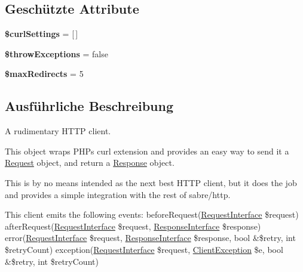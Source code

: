 \subsection*{Geschützte Attribute}
\begin{DoxyCompactItemize}
\item 
\mbox{\label{class_sabre_1_1_h_t_t_p_1_1_client_afe002e1ef057ea8527dc64a347d3f161}} 
{\bfseries \$curl\+Settings} = \mbox{[}$\,$\mbox{]}
\item 
\mbox{\label{class_sabre_1_1_h_t_t_p_1_1_client_a0df41d188b89967859a97aade5358a3b}} 
{\bfseries \$throw\+Exceptions} = false
\item 
\mbox{\label{class_sabre_1_1_h_t_t_p_1_1_client_ac54b34692677c31c7ca271a8ea03bc4e}} 
{\bfseries \$max\+Redirects} = 5
\end{DoxyCompactItemize}


\subsection{Ausführliche Beschreibung}
A rudimentary H\+T\+TP client.

This object wraps P\+HP\textquotesingle{}s curl extension and provides an easy way to send it a \mbox{\hyperlink{class_sabre_1_1_h_t_t_p_1_1_request}{Request}} object, and return a \mbox{\hyperlink{class_sabre_1_1_h_t_t_p_1_1_response}{Response}} object.

This is by no means intended as the next best H\+T\+TP client, but it does the job and provides a simple integration with the rest of sabre/http.

This client emits the following events\+: before\+Request(\mbox{\hyperlink{interface_sabre_1_1_h_t_t_p_1_1_request_interface}{Request\+Interface}} \$request) after\+Request(\mbox{\hyperlink{interface_sabre_1_1_h_t_t_p_1_1_request_interface}{Request\+Interface}} \$request, \mbox{\hyperlink{interface_sabre_1_1_h_t_t_p_1_1_response_interface}{Response\+Interface}} \$response) error(\mbox{\hyperlink{interface_sabre_1_1_h_t_t_p_1_1_request_interface}{Request\+Interface}} \$request, \mbox{\hyperlink{interface_sabre_1_1_h_t_t_p_1_1_response_interface}{Response\+Interface}} \$response, bool \&\$retry, int \$retry\+Count) exception(\mbox{\hyperlink{interface_sabre_1_1_h_t_t_p_1_1_request_interface}{Request\+Interface}} \$request, \mbox{\hyperlink{class_sabre_1_1_h_t_t_p_1_1_client_exception}{Client\+Exception}} \$e, bool \&\$retry, int \$retry\+Count)


